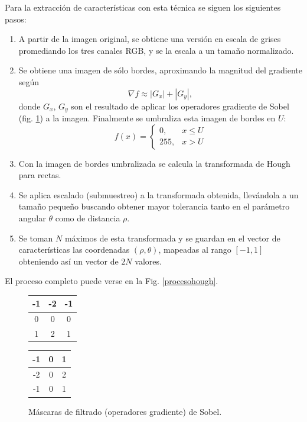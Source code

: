 \documentclass[conference,spanish,a4paper,10pt,oneside,final]{tfmpd}
\begin{document}
Para la extracción de características con esta técnica se siguen los siguientes
pasos:
\begin{enumerate}
\item A partir de la imagen original, se obtiene una versión en escala de grises
      promediando los tres canales RGB, y se la escala a un tamaño normalizado.
\item Se obtiene una imagen de sólo bordes, aproximando la magnitud del
      gradiente según
      \begin{equation}
      \label{sob}
      \nabla f \approx |G_x| + |G_y|,
      \end{equation}
      donde $G_x$, $G_y$ son el resultado de aplicar los operadores gradiente
      de Sobel (fig. \ref{masksobel}) a la imagen. 
      Finalmente se umbraliza esta imagen de bordes en $U$:
      \begin{equation}
      \label{umbral}
      f(x)=
      \begin{cases}
      0, & x\leq U\\
      255, & x > U
      \end{cases}
      \end{equation}
\item Con la imagen de bordes umbralizada se calcula la transformada de
      Hough para rectas.
\item Se aplica escalado (submuestreo) a la transformada obtenida, llevándola
      a un tamaño
      pequeño buscando obtener mayor tolerancia tanto en el parámetro angular
      $\theta$ como de distancia $\rho$.
\item Se toman $N$ máximos de esta transformada y se guardan en el vector de
      características las coordenadas $(\rho,\theta)$, mapeadas al rango
      $[-1,1]$ obteniendo así un vector de $2N$ valores.
\end{enumerate}
El proceso completo puede verse en la Fig. \ref{procesohough}.
\begin{figure}
\begin{center}
\begin{tabular}{|c|c|c|}
\hline -1 & -2 & -1 \\\hline 0 & 0 & 0 \\\hline 1 & 2 & 1 \\\hline
\end{tabular}
\begin{tabular}{|c|c|c|}
\hline -1 & 0 & 1 \\\hline -2 & 0 & 2 \\\hline -1 & 0 & 1 \\\hline
\end{tabular}
\end{center}
\caption{Máscaras de filtrado (operadores gradiente) de Sobel.}
\label{masksobel}
\end{figure}
\end{document}
